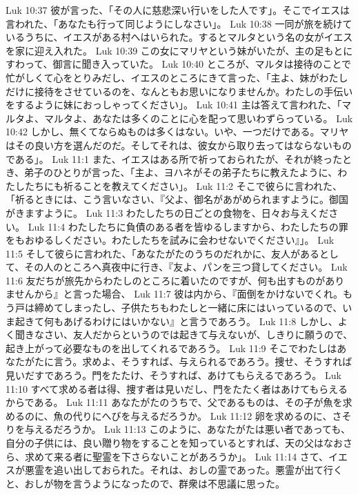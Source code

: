 Luk 10:37  彼が言った、「その人に慈悲深い行いをした人です」。そこでイエスは言われた、「あなたも行って同じようにしなさい」。
Luk 10:38  一同が旅を続けているうちに、イエスがある村へはいられた。するとマルタという名の女がイエスを家に迎え入れた。
Luk 10:39  この女にマリヤという妹がいたが、主の足もとにすわって、御言に聞き入っていた。
Luk 10:40  ところが、マルタは接待のことで忙がしくて心をとりみだし、イエスのところにきて言った、「主よ、妹がわたしだけに接待をさせているのを、なんともお思いになりませんか。わたしの手伝いをするように妹におっしゃってください」。
Luk 10:41  主は答えて言われた、「マルタよ、マルタよ、あなたは多くのことに心を配って思いわずらっている。
Luk 10:42  しかし、無くてならぬものは多くはない。いや、一つだけである。マリヤはその良い方を選んだのだ。そしてそれは、彼女から取り去ってはならないものである」。
Luk 11:1  また、イエスはある所で祈っておられたが、それが終ったとき、弟子のひとりが言った、「主よ、ヨハネがその弟子たちに教えたように、わたしたちにも祈ることを教えてください」。
Luk 11:2  そこで彼らに言われた、「祈るときには、こう言いなさい、『父よ、御名があがめられますように。御国がきますように。
Luk 11:3  わたしたちの日ごとの食物を、日々お与えください。
Luk 11:4  わたしたちに負債のある者を皆ゆるしますから、わたしたちの罪をもおゆるしください。わたしたちを試みに会わせないでください』」。
Luk 11:5  そして彼らに言われた、「あなたがたのうちのだれかに、友人があるとして、その人のところへ真夜中に行き、『友よ、パンを三つ貸してください。
Luk 11:6  友だちが旅先からわたしのところに着いたのですが、何も出すものがありませんから』と言った場合、
Luk 11:7  彼は内から、『面倒をかけないでくれ。もう戸は締めてしまったし、子供たちもわたしと一緒に床にはいっているので、いま起きて何もあげるわけにはいかない』と言うであろう。
Luk 11:8  しかし、よく聞きなさい、友人だからというのでは起きて与えないが、しきりに願うので、起き上がって必要なものを出してくれるであろう。
Luk 11:9  そこでわたしはあなたがたに言う。求めよ、そうすれば、与えられるであろう。捜せ、そうすれば見いだすであろう。門をたたけ、そうすれば、あけてもらえるであろう。
Luk 11:10  すべて求める者は得、捜す者は見いだし、門をたたく者はあけてもらえるからである。
Luk 11:11  あなたがたのうちで、父であるものは、その子が魚を求めるのに、魚の代りにへびを与えるだろうか。
Luk 11:12  卵を求めるのに、さそりを与えるだろうか。
Luk 11:13  このように、あなたがたは悪い者であっても、自分の子供には、良い贈り物をすることを知っているとすれば、天の父はなおさら、求めて来る者に聖霊を下さらないことがあろうか」。
Luk 11:14  さて、イエスが悪霊を追い出しておられた。それは、おしの霊であった。悪霊が出て行くと、おしが物を言うようになったので、群衆は不思議に思った。
